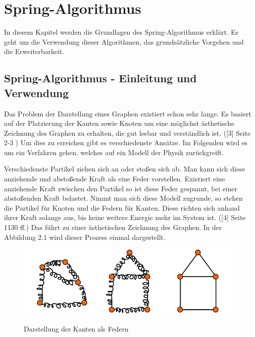 
\chapter{Spring-Algorithmus}
\label{Kapitel 2}
%
In diesem Kapitel werden die Grundlagen des Spring-Algorithmus erklärt. 
Es geht um die Verwendung dieser Algorithmen, das grundsätzliche Vorgehen
und die Erweiterbarkeit.



\section{Spring-Algorithmus - Einleitung und Verwendung}
\label{Kapitel_2_-_Unterkapitel_1}
%
Das Problem der Darstellung eines Graphen existiert schon sehr
lange. Es basiert auf der Platzierung der Kanten sowie
Knoten um eine möglichst ästhetische Zeichnung des
Graphen zu erhalten, die gut lesbar und verständlich ist. ([3] Seite 2-3 )
Um dies zu erreichen gibt es verschiedenste Ansätze. Im 
Folgenden wird es um ein Verfahren gehen, welches auf ein Modell
der Physik zurückgreift. 

Verschiedenste Partikel ziehen sich an oder stoßen sich ab. Man 
kann sich diese anziehende und abstoßende Kraft als eine Feder
vorstellen. Existiert eine anziehende Kraft zwischen den Partikel so
ist diese Feder gespannt, bei einer abstoßenden Kraft belastet. 
Nimmt man sich diese Modell zugrunde, so stehen die Partikel
für Knoten und die Federn für Kanten. Diese richten 
sich anhand ihrer Kraft solange aus, bis keine weitere Energie 
mehr im System ist. ([4] Seite 1130 ff.) Das führt zu einer ästhetischen
Zeichnung des Graphen. In der Abbildung 2.1 wird dieser Prozess einmal
dargestellt.

    \begin{figure}[t]
    	\centering
    	{\includegraphics[scale=0.8]{bilder/graphfeder}\label{fig_graphfeder}
    	}\\
    	\caption[Darstellung der Kanten als Federn]{Darstellung der Kanten als Federn}
    	\label{fig_testbild2}
    \end{figure}



